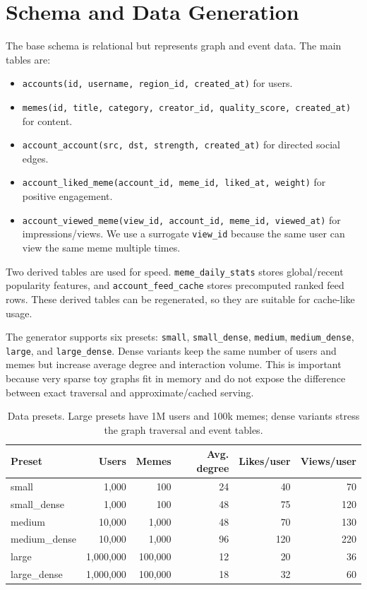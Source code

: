 \documentclass[11pt,a4paper]{article}
\begin{document}
\section{Schema and Data Generation}
The base schema is relational but represents graph and event data. The main tables are:
\begin{itemize}
    \item \texttt{accounts(id, username, region\_id, created\_at)} for users.
    \item \texttt{memes(id, title, category, creator\_id, quality\_score, created\_at)} for content.
    \item \texttt{account\_account(src, dst, strength, created\_at)} for directed social edges.
    \item \texttt{account\_liked\_meme(account\_id, meme\_id, liked\_at, weight)} for positive engagement.
    \item \texttt{account\_viewed\_meme(view\_id, account\_id, meme\_id, viewed\_at)} for impressions/views. We use a surrogate \texttt{view\_id} because the same user can view the same meme multiple times.
\end{itemize}

Two derived tables are used for speed. \texttt{meme\_daily\_stats} stores global/recent popularity features, and \texttt{account\_feed\_cache} stores precomputed ranked feed rows. These derived tables can be regenerated, so they are suitable for cache-like usage.

The generator supports six presets: \texttt{small}, \texttt{small\_dense}, \texttt{medium}, \texttt{medium\_dense}, \texttt{large}, and \texttt{large\_dense}. Dense variants keep the same number of users and memes but increase average degree and interaction volume. This is important because very sparse toy graphs fit in memory and do not expose the difference between exact traversal and approximate/cached serving.

\begin{table}[H]
\centering
\caption{Data presets. Large presets have 1M users and 100k memes; dense variants stress the graph traversal and event tables.}
\begin{tabular}{lrrrrr}
\toprule
Preset & Users & Memes & Avg. degree & Likes/user & Views/user \\
\midrule
small & 1,000 & 100 & 24 & 40 & 70 \\
small\_dense & 1,000 & 100 & 48 & 75 & 120 \\
medium & 10,000 & 1,000 & 48 & 70 & 130 \\
medium\_dense & 10,000 & 1,000 & 96 & 120 & 220 \\
large & 1,000,000 & 100,000 & 12 & 20 & 36 \\
large\_dense & 1,000,000 & 100,000 & 18 & 32 & 60 \\
\bottomrule
\end{tabular}
\end{table}
\end{document}
